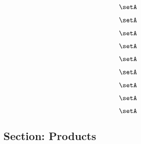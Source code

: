 {\begin{forslides}
    \begin{equation}
        \label{eq:combination-181}
        \setA
    \end{equation}

    \begin{equation}
        \label{eq:combination-182}
        \setA
    \end{equation}

    \begin{equation}
        \label{eq:combination-183}
        \setA
    \end{equation}

    \begin{equation}
        \label{eq:combination-184}
        \setA
    \end{equation}

    \begin{equation}
        \label{eq:combination-185}
        \setA
    \end{equation}

    \begin{equation}
        \label{eq:combination-186}
        \setA
    \end{equation}

    \begin{equation}
        \label{eq:combination-187}
        \setA
    \end{equation}

    \begin{equation}
        \label{eq:combination-188}
        \setA
    \end{equation}

    \begin{equation}
        \label{eq:combination-189}
        \setA
    \end{equation}

    \subsection{Section: Products}


\end{forslides}}
